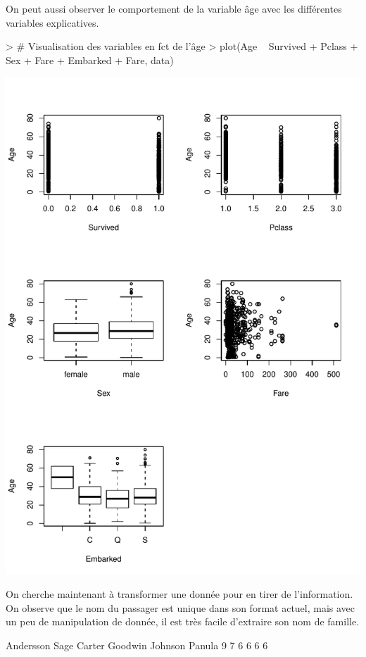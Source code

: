 \documentclass[11pt,french]{report}
\begin{document}
\bigskip
On peut aussi observer le comportement de la variable âge avec les différentes variables explicatives.
\begin{Schunk}
\begin{Sinput}
> # Visualisation des variables en fct de l'âge
> plot(Age ~ Survived + Pclass + Sex + Fare + Embarked + Fare, data)
\end{Sinput}
\end{Schunk}

\bigskip
\includegraphics{notes_de_cours-037}
\bigskip

On cherche maintenant à transformer une donnée pour en tirer de l'information. On observe que le nom du passager est unique dans son format actuel, mais avec un peu de manipulation de donnée, il est très facile d'extraire son nom de famille.


\begin{Schunk}
\begin{Soutput}
Andersson      Sage    Carter   Goodwin   Johnson    Panula 
        9         7         6         6         6         6 
\end{Soutput}
\end{Schunk}
\end{document}
